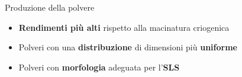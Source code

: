 \documentclass[15pt, aspectratio=169]{beamer}
\begin{document}
    \begin{frame}{Produzione della polvere}


        \begin{itemize}
          \item <5-7> \textbf{Rendimenti più alti} rispetto alla macinatura criogenica
          \item <6-7> Polveri con una \textbf{distribuzione} di dimensioni più \textbf{uniforme}
          \item <7> Polveri con \textbf{morfologia} adeguata per l'\textbf{SLS}
        \end{itemize}
        
      \end{frame}
\end{document}
